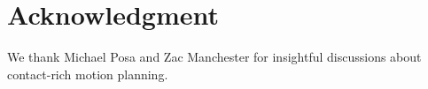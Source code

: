 \section*{Acknowledgment}

We thank Michael Posa and Zac Manchester for insightful discussions about contact-rich motion planning.


